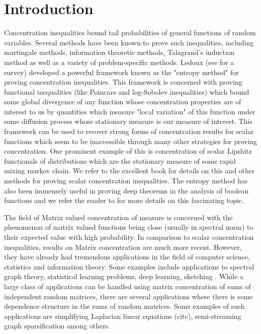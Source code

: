 \color{black}
\section{Introduction}
Concentration inequalities bound tail probabilities of general functions of random variables. Several methods have been known to prove such inequalities, including martingale methods, information theoretic methods, Talagrand's induction method as well as a variety of problem-specific methods. Ledoux (see \cite{Led} for a survey) developed a powerful framework known as the "entropy method" for proving concentration inequalities. This framework is concerned with proving functional inequalities (like Poincare and log-Sobolev inequalities) which bound some global divergence of any function whose concentration properties are of interest to us by quantities which measure "local variation" of this function under some diffusion process whose stationary measure is our measure of interest. This framework can be used to recover strong forms of concentration results for scalar functions which seem to be inaccessible through many other strategies for proving concentration. One prominent example of this is concentration of scalar Lipshitz functionals of distributions which are the stationary measure of some rapid mixing markov chain. We refer to the excellent book \cite{BLM13} for details on this and other methods for proving scalar concentration inequalities. The entropy method has also been immensely useful in proving deep theorems in the analysis of boolean functions and we refer the reader to \cite{OD} for more details on this fascinating topic.

The field of Matrix valued concentration of measure is concerned with the phenomenon of matrix valued functions being close (usually in spectral norm) to their expected value with high probability. In comparison to scalar concentration inequalities, results on Matrix concentration are much more recent. However, they have already had tremendous applications in the field of computer science, statistics and information theory. Some examples include applications to spectral graph theory, statistical learning problems, deep learning, sketching . While a large class of applications can be handled using matrix concentration of sums of independent random matrices, there are several applications where there is some dependence structure in the sums of random matrices. Some examples of such applications are simplifying Laplacian linear equations (cite), semi-streaming graph sparsification among others.

